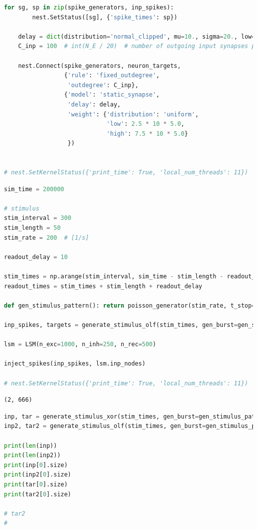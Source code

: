 \begin{lstlisting}[language=Python]
    for sg, sp in zip(spike_generators, inp_spikes):
        nest.SetStatus([sg], {'spike_times': sp})

    delay = dict(distribution='normal_clipped', mu=10., sigma=20., low=3., high=200.)
    C_inp = 100  # int(N_E / 20)  # number of outgoing input synapses per input neuron

    nest.Connect(spike_generators, neuron_targets,
                 {'rule': 'fixed_outdegree',
                  'outdegree': C_inp},
                 {'model': 'static_synapse',
                  'delay': delay,
                  'weight': {'distribution': 'uniform',
                             'low': 2.5 * 10 * 5.0,
                             'high': 7.5 * 10 * 5.0}
                  })


# nest.SetKernelStatus({'print_time': True, 'local_num_threads': 11})
\end{lstlisting}

\begin{lstlisting}[language=Python]
sim_time = 200000

# stimulus
stim_interval = 300
stim_length = 50
stim_rate = 200  # [1/s]

readout_delay = 10

stim_times = np.arange(stim_interval, sim_time - stim_length - readout_delay, stim_interval)
readout_times = stim_times + stim_length + readout_delay

def gen_stimulus_pattern(): return poisson_generator(stim_rate, t_stop=stim_length)

inp_spikes, targets = generate_stimulus_olf(stim_times, gen_burst=gen_stimulus_pattern)

lsm = LSM(n_exc=1000, n_inh=250, n_rec=500)

inject_spikes(inp_spikes, lsm.inp_nodes)

# nest.SetKernelStatus({'print_time': True, 'local_num_threads': 11})
\end{lstlisting}

\begin{lstlisting}
(2, 666)
\end{lstlisting}

\begin{lstlisting}[language=Python]
inp, tar = generate_stimulus_xor(stim_times, gen_burst=gen_stimulus_pattern)
inp2, tar2 = generate_stimulus_olf(stim_times, gen_burst=gen_stimulus_pattern, n_inputs=3)

print(len(inp))
print(len(inp2))
print(inp[0].size)
print(inp2[0].size)
print(tar[0].size)
print(tar2[0].size)

# tar2
# 
\end{lstlisting}

